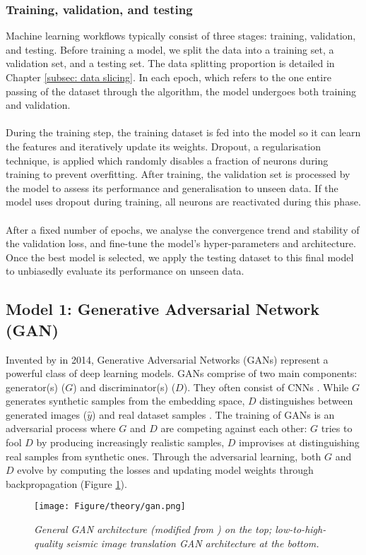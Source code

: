 \subsubsection{Training, validation, and testing}
Machine learning workflows typically consist of three stages: training, validation, and testing. Before training a model, we split the data into a training set, a validation set, and a testing set. The data splitting proportion is detailed in Chapter \ref{subsec: data slicing}. In each epoch, which refers to the one entire passing of the dataset through the algorithm, the model undergoes both training and validation.
\\\\
During the training step, the training dataset is fed into the model so it can learn the features and iteratively update its weights. Dropout, a regularisation technique, is applied which randomly disables a fraction of neurons during training to prevent overfitting. After training, the validation set is processed by the model to assess its performance and generalisation to unseen data. If the model uses dropout during training, all neurons are reactivated during this phase.
\\\\
After a fixed number of epochs, we analyse the convergence trend and stability of the validation loss, and fine-tune the model's hyper-parameters and architecture. Once the best model is selected, we apply the testing dataset to this final model to unbiasedly evaluate its performance on unseen data.





\subsection{Model 1: Generative Adversarial Network (GAN)} \label{subsec:M1}
Invented by \citeauthor{goodfellow2014generative} in 2014, Generative Adversarial Networks (GANs) represent a powerful class of deep learning models. GANs comprise of two main components: generator(s) ($G$) and discriminator(s) ($D$). They often consist of CNNs \cite{siahkoohi2018seismic}. While $G$ generates synthetic samples from the embedding space, $D$ distinguishes between generated images ($\hat{y}$) and real dataset samples \cite{lau2024}. The training of GANs is an adversarial process where $G$ and $D$ are competing against each other: $G$ tries to fool $D$ by producing increasingly realistic samples, $D$ improvises at distinguishing real samples from synthetic ones. Through the adversarial learning, both $G$ and $D$ evolve by computing the losses and updating model weights through backpropagation (Figure \ref{fig:gan}).
\\
\begin{figure}[h]
	\centering
	\texttt{[image: Figure/theory/gan.png]} %
	\caption{\textit{General GAN architecture (modified from ) on the top; low-to-high-quality seismic image translation GAN architecture at the bottom.}}

	\label{fig:gan}
\end{figure}

